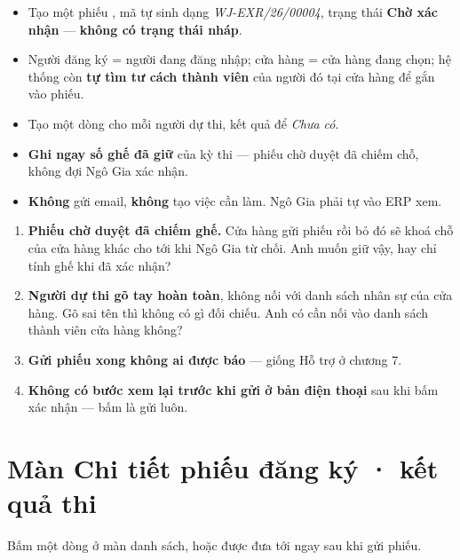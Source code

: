 \begin{itemize}[leftmargin=*]
  \item Tạo một phiếu , mã tự sinh dạng \emph{WJ-EXR/26/00004},
        trạng thái \textbf{Chờ xác nhận} --- \textbf{không có trạng thái nháp}.
  \item Người đăng ký = người đang đăng nhập; cửa hàng = cửa hàng đang chọn; hệ thống còn
        \textbf{tự tìm tư cách thành viên} của người đó tại cửa hàng để gắn vào phiếu.
  \item Tạo một dòng  cho mỗi người dự thi, kết quả để
        \emph{Chưa có}.
  \item \textbf{Ghi ngay số ghế đã giữ} của kỳ thi --- phiếu chờ duyệt đã chiếm chỗ, không đợi
        Ngô Gia xác nhận.
  \item \textbf{Không} gửi email, \textbf{không} tạo việc cần làm. Ngô Gia phải tự vào ERP xem.
\end{itemize}

\mhoi

\begin{ask}
\begin{enumerate}[leftmargin=*]
  \item \textbf{Phiếu chờ duyệt đã chiếm ghế.} Cửa hàng gửi phiếu rồi bỏ đó sẽ khoá chỗ của
        cửa hàng khác cho tới khi Ngô Gia từ chối. Anh muốn giữ vậy, hay chỉ tính ghế khi đã
        xác nhận?
  \item \textbf{Người dự thi gõ tay hoàn toàn}, không nối với danh sách nhân sự của cửa hàng.
        Gõ sai tên thì không có gì đối chiếu. Anh có cần nối vào danh sách thành viên cửa hàng
        không?
  \item \textbf{Gửi phiếu xong không ai được báo} --- giống Hỗ trợ ở chương 7.
  \item \textbf{Không có bước xem lại trước khi gửi ở bản điện thoại} sau khi bấm xác nhận ---
        bấm là gửi luôn.
\end{enumerate}
\end{ask}

\section{Màn Chi tiết phiếu đăng ký · kết quả thi}
\medskip

\mvao

Bấm một dòng ở màn danh sách, hoặc được đưa tới ngay sau khi gửi phiếu.

